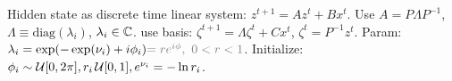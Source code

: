\begin{definition}[LRU]
    Hidden state as discrete time linear system: \(z^{t+1} = Az^t + Bx^t\). Use \(A = P\Lambda P^{-1}\), \(\Lambda \equiv \text{diag}(\lambda_i)\), \(\lambda_i \in \mathbb{C}\). use basis: \(\zeta^{t+1} = \Lambda \zeta^t + Cx^t\), \(\zeta^t = P^{-1} z^t\). Param: \(\lambda_i = \exp(-\exp(\nu_i) + i\phi_i) {\color{gray} = re^{i\phi}, \ 0 < r < 1}\). Initialize: \(\phi_i \sim \operatorname{\mathcal{U}}[0, 2\pi], r_i \operatorname{\mathcal{U}}[0, 1], e^{\nu_i} = - \ln r_i\).
     
\end{definition}
